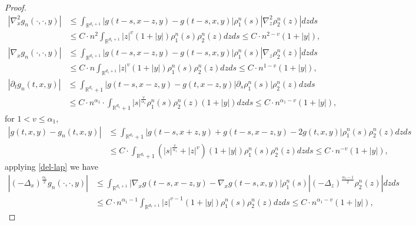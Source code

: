 \documentclass[11pt,reqno]{amsart}
\numberwithin{equation}{section}
\begin{document}
\begin{proof}
\begin{align*}
	|\nabla_{x}^{2}g_{n}(\cdot,\cdot,y)|&\leq \int_{\mathbb{R}^{ d_{1}+1}}	|g(t-s,x-z,y)-g(t-s,x,y)|\rho_{1}^{n}(s)|\nabla^{2}_{z}\rho_{2}^{n}(z)|dzds\\
	&\leq C\cdot n^{2}\int_{\mathbb{R}^{ d_{1}+1}}	|z|^{v}(1+|y|)\rho_{1}^{n}(s)\rho_{2}^{n}(z)dzds\leq C\cdot n^{2-v}(1+|y|),
\end{align*}
\begin{align*}
	|\nabla_{x}g_{n}(\cdot,\cdot,y)|&\leq \int_{\mathbb{R}^{ d_{1}+1}}	|g(t-s,x-z,y)-g(t-s,x,y)|\rho_{1}^{n}(s)|\nabla_{z}\rho_{2}^{n}(z)|dzds\\
	&\leq C\cdot n\int_{\mathbb{R}^{ d_{1}+1}}	|z|^{v}(1+|y|)\rho_{1}^{n}(s)\rho_{2}^{n}(z)dzds\leq C\cdot n^{1-v}(1+|y|),
\end{align*}
\begin{equation}\label{5.L5}
		\begin{split}
	|\partial_{t}g_{n}(t,x,y)|&\leq \int_{\mathbb{R}^{ d_{1}}+1}	|g(t-s,x-z,y)-g(t,x-z,y)|\partial_{s}\rho_{1}^{n}(s)|\rho_{2}^{n}(z)dzds\\
	&\leq C\cdot n^{\alpha_{1}}\cdot\int_{\mathbb{R}^{ d_{1}}+1}|s|^{\frac{v}{\alpha_{1}}}\rho_{1}^{n}(s)\rho_{2}^{n}(z)(1+|y|)dzds\leq C\cdot n^{\alpha_{1}-v}(1+|y|),
	\end{split}
\end{equation}
for $1<v\leq\alpha_{1}$,
\begin{align*}
	|g(t,x,y)-g_{n}(t,x,y)|	&\leq \int_{\mathbb{R}^{ d_{1}}+1}	|g(t-s,x+z,y)+g(t-s,x-z,y)-2g(t,x,y)|\rho_{1}^{n}(s)\rho_{2}^{n}(z)dzds\\
	&\leq C\cdot\int_{\mathbb{R}^{ d_{1}}+1}	(|s|^{\frac{v}{\alpha_{1}}}+|z|^{v})(1+|y|)\rho_{1}^{n}(s)\rho_{2}^{n}(z)dzds\leq C\cdot n^{-v}(1+|y|),
	\end{align*} 
applying \eqref{del-lap} we have
\begin{align*}
	|(-\Delta_{x})^{\frac{\alpha_{1}}{2}}g_{n}(\cdot,\cdot,y)|&\leq \int_{\mathbb{R}^{ d_{1}+1}}	|\nabla_{x}g(t-s,x-z,y)-\nabla_{x}g(t-s,x,y)|\rho_{1}^{n}(s)|(-\Delta_{z})^{\frac{\alpha_{1}-1}{2}}\rho_{2}^{n}(z)|dzds\\
	&\leq C\cdot n^{\alpha_{1}-1}\int_{\mathbb{R}^{ d_{1}+1}}	|z|^{v-1}(1+|y|)\rho_{1}^{n}(s)\rho_{2}^{n}(z)dzds\leq C\cdot n^{\alpha_{1}-v}(1+|y|),
\end{align*}

\end{proof}
\end{document}
